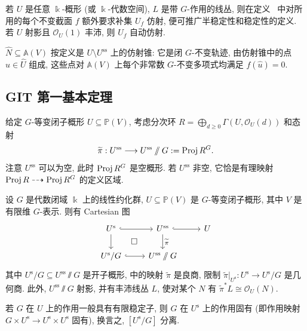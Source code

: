 \begin{remark}[非射影情形]\label{src:8.2.3}
若 $U$ 是任意 $\Bbbk$-概形 (或 $\Bbbk$-代数空间), $L$ 是带 $G$-作用的线丛, 则在定义~ 中对所用的每个不变截面 $f$ 额外要求补集 $U_f$ 仿射, 便可推广半稳定性和稳定性的定义. 若 $U$ 射影且 $\mathcal O_U(1)$ 丰沛, 则 $U_f$ 自动仿射.
\end{remark}
\begin{remark}[零锥]\label{src:8.2.4}
 $\widehat N\subseteq\mathbb A(V)$ 按定义是 $U\setminus U^{\mathrm{ss}}$ 上的仿射锥: 它是闭 $G$-不变轨迹, 由仿射锥中的点 $\widehat u\in\widehat U$ 组成, 这些点对 $\mathbb A(V)$ 上每个非常数 $G$-不变多项式均满足 $f(\widehat u)=0$.
\end{remark}
\subsection{GIT 第一基本定理}\label{src:8.2.2-subsection}
给定 $G$-等变闭子概形 $U\subseteq\mathbb P(V)$, 考虑分次环 $R=\bigoplus_{d\geq0}\Gamma(U,\mathcal O_U(d))$ 和态射
\begin{equation}\label{src:8.2.5}
\widetilde\pi:U^{\mathrm{ss}}\longrightarrow U^{\mathrm{ss}}\mathbin{/\mkern-6mu/} G:=\operatorname{Proj} R^G.
\end{equation}
注意 $U^{\mathrm{ss}}$ 可以为空, 此时 $\operatorname{Proj} R^G$ 是空概形. 若 $U^{\mathrm{ss}}$ 非空, 它恰是有理映射 $\operatorname{Proj} R\dashrightarrow\operatorname{Proj} R^G$ 的定义区域.
\begin{theorem}[射影 GIT]\label{src:8.2.6}
设 $G$ 是代数闭域 $\Bbbk$ 上的线性约化群, $U\subseteq\mathbb P(V)$ 是 $G$-等变闭子概形, 其中 $V$ 是有限维 $G$-表示. 则有 Cartesian 图
\[
\begin{tikzcd}[ampersand replacement=\&]
U^{\mathrm s}\arrow[r,hook]\arrow[d]\arrow[dr,phantom,"\square"]\&U^{\mathrm{ss}}\arrow[r,hook]\arrow[d,"\widetilde\pi"]\&U\\
{U^{\mathrm s}/G}\arrow[r,hook]\&{U^{\mathrm{ss}}\sslash G}\&{}
\end{tikzcd}
\]
其中 $U^{\mathrm s}/G\subseteq U^{\mathrm{ss}}\sslash G$ 是开子概形,  中的映射 $\widetilde\pi$ 是良商, 限制 $\widetilde\pi|_{U^{\mathrm s}}:U^{\mathrm s}\to U^{\mathrm s}/G$ 是几何商. 此外, $U^{\mathrm{ss}}\sslash G$ 射影, 并有丰沛线丛 $L$, 使对某个 $N$ 有 $\widetilde\pi^*L\cong\mathcal O_U(N)$.

若 $G$ 在 $U$ 上的作用一般具有有限稳定子, 则 $G$ 在 $U^{\mathrm s}$ 上的作用固有 (即作用映射 $G\times U^{\mathrm s}\to U^{\mathrm s}\times U^{\mathrm s}$ 固有), 换言之, $[U^{\mathrm s}/G]$ 分离.
\end{theorem}
